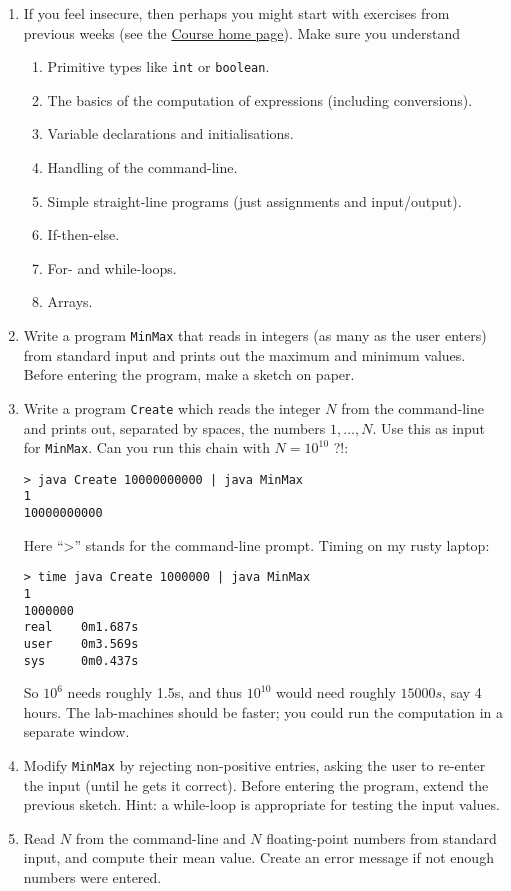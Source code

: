 \documentclass[11pt]{article}
\newcommand{\inl}[1]{\lstinline$#1$}
\begin{document}
\begin{enumerate}
\item If you feel insecure, then perhaps you might start with exercises from previous weeks (see the \href{\chp}{Course home page}). Make sure you understand
  \begin{enumerate}
  \item Primitive types like \inl{int} or \inl{boolean}.
  \item The basics of the computation of expressions (including conversions).
  \item Variable declarations and initialisations.
  \item Handling of the command-line.
  \item Simple straight-line programs (just assignments and input/output).
  \item If-then-else.
  \item For- and while-loops.
  \item Arrays.
  \end{enumerate}
\item Write a program \texttt{MinMax} that reads in integers (as many as the user enters) from standard input and prints out the maximum and minimum values. Before entering the program, make a sketch on paper.
\item Write a program \texttt{Create} which reads the integer $N$ from the command-line and prints out, separated by spaces, the numbers $1, \dots, N$. Use this as input for \texttt{MinMax}. Can you run this chain with $N=10^{10}$ ?!:
\begin{verbatim}
> java Create 10000000000 | java MinMax
1
10000000000
\end{verbatim}
Here ``>'' stands for the command-line prompt. Timing on my rusty laptop:
\begin{verbatim}
> time java Create 1000000 | java MinMax
1
1000000
real    0m1.687s
user    0m3.569s
sys     0m0.437s
\end{verbatim}
So $10^6$ needs roughly 1.5s, and thus $10^{10}$ would need roughly $15000s$, say 4 hours. The lab-machines should be faster; you could run the computation in a separate window.
\item Modify \texttt{MinMax} by rejecting non-positive entries, asking the user to re-enter the input (until he gets it correct). Before entering the program, extend the previous sketch. Hint: a while-loop is appropriate for testing the input values.
\item Read $N$ from the command-line and $N$ floating-point numbers from standard input, and compute their mean value. Create an error message if not enough numbers were entered.
\end{enumerate}
\end{document}
